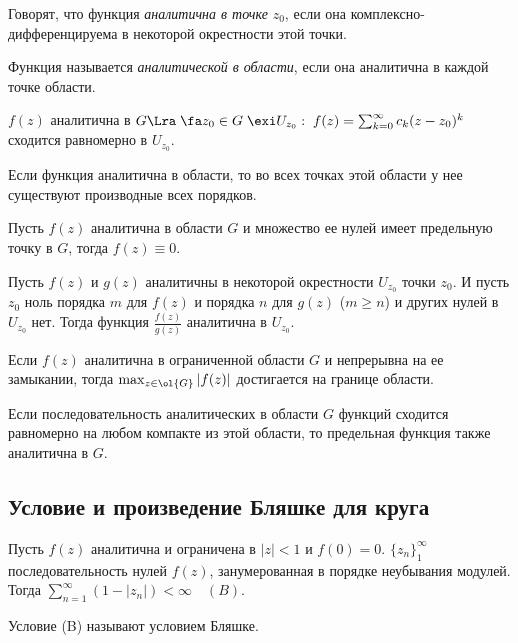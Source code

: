 \documentclass{article}
\begin{document}
\begin{df}
  Говорят, что функция \emph{аналитична в
    точке} $z_0$, если она комплексно-дифференцируема в некоторой
  окрестности этой точки.
\end{df}

\begin{df}
  Функция называется \emph{аналитической в
    области}, если она аналитична в каждой точке области.
\end{df}

\begin{theorem}
$f(z)$ аналитична в $G\Lra\;\fa z_0\in G\;\exi
U_{z_0}:\;f(z)=\sum_{k=0}^{\infty}c_k(z-z_0)^k$ сходится
равномерно в $U_{z_0}.$
\end{theorem}


\begin{theorem}
Если функция аналитична в области, то во всех точках этой области
у нее существуют производные всех порядков.
\end{theorem}

\begin{theorem}[Единственности]
Пусть $f(z)$ аналитична в области $G$ и множество ее нулей имеет
предельную точку в $G$, тогда $f(z)\equiv0.$
\end{theorem}

\begin{theorem}
Пусть $f(z)$ и $g(z)$ аналитичны в некоторой окрестности $U_{z_0}$
точки $z_0$. И пусть $z_0$ ноль порядка $m$ для $f(z)$ и порядка
$n$ для $g(z)$ ($m\ge n$) и других нулей в $U_{z_0}$ нет. Тогда
функция $\frac {f(z)}{g(z)}$ аналитична в $U_{z_0}$.
\end{theorem}

\begin{theorem}
Если $f(z)$ аналитична в ограниченной области $G$ и непрерывна на
ее замыкании, тогда $\max_{z\in \ol{G}}|f(z)|$ достигается
на границе области.
\end{theorem}

\begin{theorem}[Вейерштрасс]
Если последовательность аналитических в области $G$ функций
сходится равномерно на любом компакте из этой области, то
предельная функция также аналитична в $G.$
\end{theorem}

\subsection{Условие и произведение Бляшке для круга}
\begin{theorem}
Пусть $f(z)$ аналитична и ограничена в $|z|<1$ и $f(0)=0$.
$\{z_n\}_1^{\infty}$ последовательность нулей $f(z)$,
занумерованная в порядке неубывания модулей. Тогда
$\sum_{n=1}^{\infty}(1-|z_n|)<\infty\quad(B).$
\end{theorem}
Условие (B) называют условием Бляшке.
\end{document}
